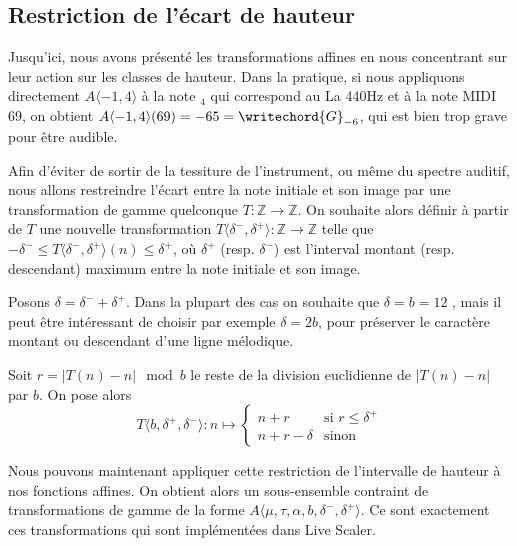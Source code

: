 \subsection{Restriction de l'écart de hauteur}
Jusqu'ici, nous avons présenté les transformations affines en nous concentrant sur leur action sur les classes de hauteur. Dans la pratique, si nous appliquons directement $A\langle -1,4 \rangle$ à la note  $_4$ qui correspond au La 440Hz et à la note MIDI $69$, on obtient $A\langle -1,4 \rangle(69)  = -65 = \writechord{G}_{-6}$, qui est bien trop grave pour être audible. 

Afin d'éviter de sortir de la tessiture de l'instrument, ou même du spectre auditif, nous allons restreindre l'écart entre la note initiale et son image par une transformation de gamme quelconque $T : \mathbb{Z}\rightarrow \mathbb{Z}$. On souhaite alors définir à partir de $T$ une nouvelle transformation $T\langle \delta^-, \delta^+\rangle : \mathbb{Z}\rightarrow \mathbb{Z}$ telle que $ - \delta^- \leq T\langle \delta^-, \delta^+\rangle(n) \leq \delta ^+$, où $\delta^+$ (resp. $\delta^-$) est l'interval montant (resp. descendant) maximum entre la note initiale et son image.

Posons $\delta = \delta^- + \delta^+$.  Dans la plupart des cas on souhaite que $\delta = b = 12$ , mais il peut être intéressant de choisir par exemple $\delta  = 2b$, pour préserver le caractère montant ou descendant d'une ligne mélodique.

Soit $r = |T(n) - n | \mod b$ le reste de la division euclidienne de  $|T(n) - n |$ par $b$. On pose alors 
$$
T\langle b, \delta^+, \delta^- \rangle : n \mapsto \begin{cases}
  n + r & \text{si $r \leq \delta^+$}\\
  n + r - \delta & \text{sinon}
\end{cases}
$$

Nous pouvons maintenant appliquer cette restriction de l'intervalle de hauteur à nos fonctions affines. On obtient alors un sous-ensemble contraint de transformations de gamme de la forme $A\langle \mu, \tau, \alpha, b, \delta^-, \delta^+\rangle$. Ce sont exactement ces transformations qui sont implémentées dans Live Scaler.
  

